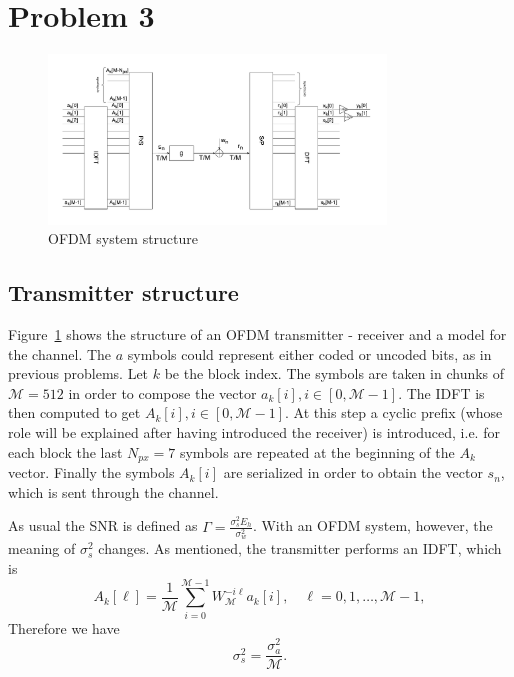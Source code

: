 \documentclass[10pt]{article}
\newcommand{\ofdM} {\mathcal{M}}
\begin{document}
\section*{Problem 3}

\begin{figure}
	\centering
	\includegraphics[width = 0.8\textwidth]{OFDM}
	\caption{OFDM system structure}
	\label{fig:OFDM}
\end{figure}

\subsection*{Transmitter structure}
Figure~\ref{fig:OFDM} shows the structure of an OFDM transmitter - receiver and a model for the channel. The $a$ symbols could represent either coded or uncoded bits, as in previous problems. Let $k$ be the block index. The symbols are taken in chunks of $\ofdM = 512$ in order to compose the vector $a_k[i], i \in [0, \ofdM - 1]$. The IDFT is then computed to get $A_k[i], i\in [0, \ofdM-1]$. At this step a cyclic prefix (whose role will be explained after having introduced the receiver) is introduced, i.e. for each block the last $N_{px} = 7$ symbols are repeated at the beginning of the $A_k$ vector. Finally the symbols $A_k[i]$ are serialized in order to obtain the vector $s_n$, which is sent through the channel.

As usual the SNR is defined as $\Gamma = \frac{\sigma_s^2 E_h}{\sigma_w^2}$. With an OFDM system, however, the meaning of $\sigma_s^2$ changes. As mentioned, the transmitter performs an IDFT, which is
\begin{equation}
	A_k[\ell] = \frac{1}{\ofdM} \sum_{i = 0}^{\ofdM - 1} W_{\ofdM}^{-i\ell} a_k[i], \quad \ell = 0, 1, \dots, \ofdM-1,
\end{equation}
Therefore we have 
\begin{equation}
	\sigma_s^2 = \dfrac{\sigma_a^2}{\ofdM}.
\end{equation}
\end{document}
